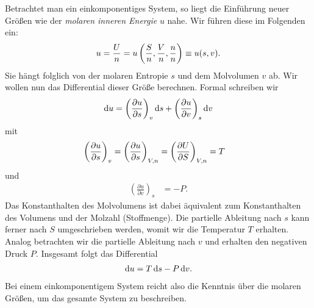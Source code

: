 Betrachtet man ein einkomponentiges System, so liegt die Einführung neuer Größen wie der \emph{molaren inneren Energie} $u$ nahe. Wir führen diese im Folgenden ein:
\begin{align*}
    u=\frac{U}{n}=u\left(\frac{S}{n},\frac{V}{n},\frac{n}{n}\right)\equiv u(s,v).
\end{align*}
Sie hängt folglich von der molaren Entropie $s$ und dem Molvolumen $v$ ab.
Wir wollen nun das Differential dieser Größe berechnen. Formal schreiben wir
\begin{align*}
    \mathop{}\!\mathrm{d} u = \left(\frac{\partial u}{\partial s}\right)_v \mathop{}\!\mathrm{d} s + \left(\frac{\partial u}{\partial v}\right)_s\mathop{}\!\mathrm{d} v
\end{align*}
mit
\begin{align*}
    \left( \frac{\partial u}{\partial s} \right)_v=\left( \frac{\partial u}{\partial s} \right)_{V,n} & =\left( \frac{\partial U}{\partial S} \right)_{V,n} =T
\end{align*}
und
\begin{align*}
    \left(\frac{\partial u}{\partial v}\right)_s & = -P.
\end{align*}
Das Konstanthalten des Molvolumens ist dabei äquivalent zum Konstanthalten des Volumens und der Molzahl (Stoffmenge). Die partielle Ableitung nach $s$ kann ferner nach $S$ umgeschrieben werden, womit wir die Temperatur $T$ erhalten.
Analog betrachten wir die partielle Ableitung nach $v$ und erhalten den negativen Druck $P$.
Insgesamt folgt das Differential
\begin{align*}
    \mathop{}\!\mathrm{d} u = T\mathop{}\!\mathrm{d} s -P\mathop{}\!\mathrm{d} v.
\end{align*}
Bei einem einkomponentigem System reicht also die Kenntnis über die molaren Größen, um das gesamte System zu beschreiben.

